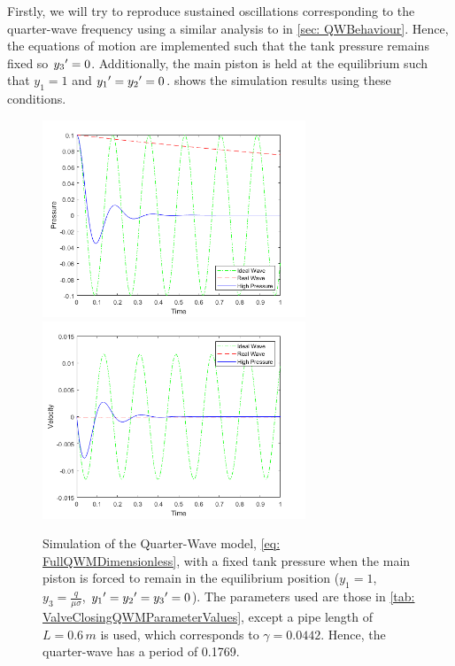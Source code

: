 Firstly, we will try to reproduce sustained oscillations corresponding to the quarter-wave frequency using a similar analysis to in \cref{sec: QWBehaviour}. Hence, the equations of motion are implemented such that the tank pressure remains fixed so $y_3{'} = 0$. Additionally, the main piston is held at the equilibrium such that $y_1 = 1$ and $y_1{'} = y_2{'} = 0$.  shows the simulation results using these conditions.
~
\begin{figure}[!ht]
    \centering
    \includegraphics[width=0.7\textwidth]{Figures/QWMSimulation/QWMBehaviourB.png}
    \includegraphics[width=0.7\textwidth]{Figures/QWMSimulation/QWMBehaviourC.png}
    \caption{Simulation of the Quarter-Wave model, \cref{eq: FullQWMDimensionless}, with a fixed tank pressure when the main piston is forced to remain in the equilibrium position ($y_1 = 1$, $y_3 = \frac{q}{\mu \sigma}$, $y_1{'}=y_2{'}=y_3{'}=0$). The parameters used are those in \cref{tab: ValveClosingQWMParameterValues}, except a pipe length of $L = 0.6 \, \si{m}$ is used, which corresponds to $\gamma = 0.0442$. Hence, the quarter-wave has a period of 0.1769.}
    \label{fig: QWMBehaviour}
\end{figure}

